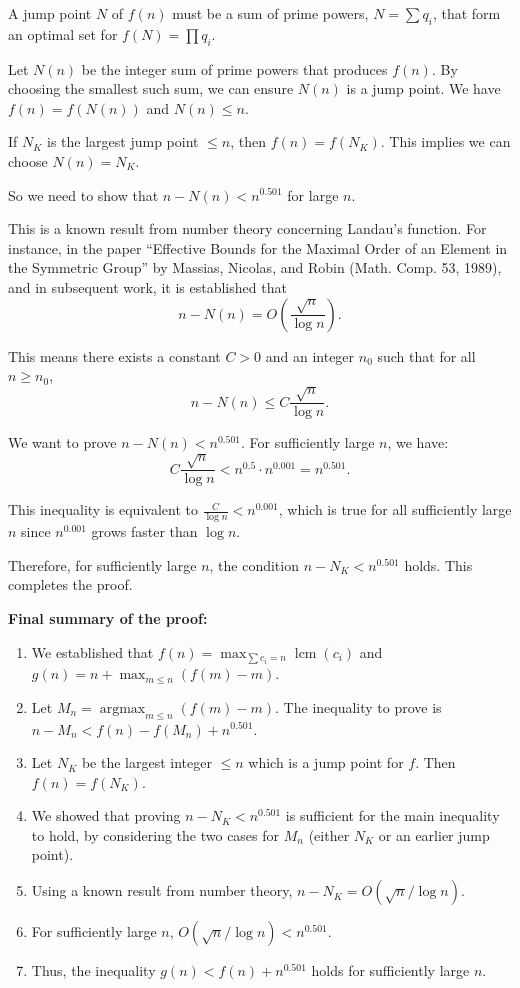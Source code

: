 \documentclass[12pt,a4paper]{article}
\theoremstyle{definition}
\begin{document}
    A jump point $N$ of $f(n)$ must be a sum of prime powers, $N = \sum q_i$, that form an optimal set for $f(N) = \prod q_i$.

    Let $N(n)$ be the integer sum of prime powers that produces $f(n)$. By choosing the smallest such sum, we can ensure $N(n)$ is a jump point. We have $f(n)=f(N(n))$ and $N(n) \le n$.

    If $N_K$ is the largest jump point $\le n$, then $f(n) = f(N_K)$. This implies we can choose $N(n)=N_K$.

    So we need to show that $n-N(n) < n^{0.501}$ for large $n$.

    This is a known result from number theory concerning Landau's function. For instance, in the paper ``Effective Bounds for the Maximal Order of an Element in the Symmetric Group'' by Massias, Nicolas, and Robin (Math. Comp. 53, 1989), and in subsequent work, it is established that
    \[ n - N(n) = O\left(\frac{\sqrt{n}}{\log n}\right). \]

    This means there exists a constant $C>0$ and an integer $n_0$ such that for all $n \ge n_0$,
    \[ n - N(n) \le C \frac{\sqrt{n}}{\log n}. \]

    We want to prove $n-N(n) < n^{0.501}$. For sufficiently large $n$, we have:
    \[ C \frac{\sqrt{n}}{\log n} < n^{0.5} \cdot n^{0.001} = n^{0.501}. \]

    This inequality is equivalent to $\frac{C}{\log n} < n^{0.001}$, which is true for all sufficiently large $n$ since $n^{0.001}$ grows faster than $\log n$.

    Therefore, for sufficiently large $n$, the condition $n-N_K < n^{0.501}$ holds. This completes the proof.

    \textbf{Final summary of the proof:}
    \begin{enumerate}
        \item We established that $f(n) = \max_{\sum c_i=n} \operatorname{lcm}(c_i)$ and $g(n) = n + \max_{m \le n} (f(m)-m)$.
        \item Let $M_n = \operatorname{argmax}_{m \le n} (f(m)-m)$. The inequality to prove is $n-M_n < f(n)-f(M_n)+n^{0.501}$.
        \item Let $N_K$ be the largest integer $\le n$ which is a jump point for $f$. Then $f(n)=f(N_K)$.
        \item We showed that proving $n-N_K < n^{0.501}$ is sufficient for the main inequality to hold, by considering the two cases for $M_n$ (either $N_K$ or an earlier jump point).
        \item Using a known result from number theory, $n-N_K = O(\sqrt{n}/\log n)$.
        \item For sufficiently large $n$, $O(\sqrt{n}/\log n) < n^{0.501}$.
        \item Thus, the inequality $g(n) < f(n) + n^{0.501}$ holds for sufficiently large $n$.
    \end{enumerate}
\end{document}
